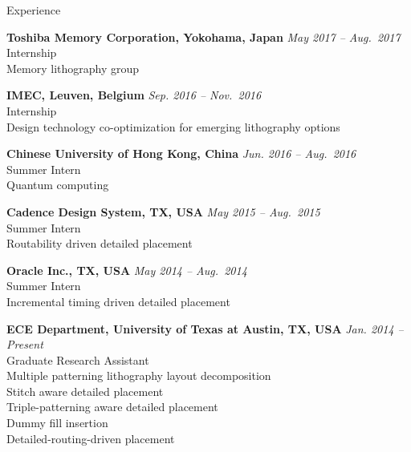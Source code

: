 
\begin{rSection}{Experience}

{\bf Toshiba Memory Corporation, Yokohama, Japan}                           \hfill {\em May 2017 -- Aug.~2017} \\
Internship \\
Memory lithography group

{\bf IMEC, Leuven, Belgium}                           \hfill {\em Sep. 2016 -- Nov.~2016} \\
Internship \\
Design technology co-optimization for emerging lithography options

{\bf Chinese University of Hong Kong, China}                           \hfill {\em Jun. 2016 -- Aug.~2016} \\
Summer Intern \\
Quantum computing

{\bf Cadence Design System, TX, USA}                           \hfill {\em May 2015 -- Aug.~2015} \\
Summer Intern \\
Routability driven detailed placement

{\bf Oracle Inc., TX, USA}                           \hfill {\em May 2014 -- Aug.~2014} \\
Summer Intern \\
Incremental timing driven detailed placement

{\bf ECE Department, University of Texas at Austin, TX, USA}  \hfill {\em Jan. 2014 -- Present} \\
Graduate Research Assistant \\
Multiple patterning lithography layout decomposition \\ %
Stitch aware detailed placement \\ %
Triple-patterning aware detailed placement \\ %
Dummy fill insertion \\ %
Detailed-routing-driven placement  %

\end{rSection}


